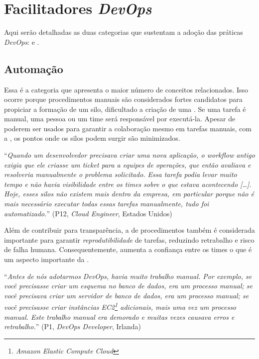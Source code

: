 \section{Facilitadores \emph{DevOps}}\label{secao_facilitadores}

Aqui serão detalhadas as duas categorias que sustentam a adoção das práticas
{\it DevOps}:  e .

\subsection{Automação} \label{ssec:automation}

Essa é a categoria que apresenta o maior número de conceitos relacionados. Isso
ocorre porque procedimentos manuais são considerados fortes candidatos para
propiciar a formação de um silo, dificultado a criação de uma \cc. Se uma tarefa
é manual, uma pessoa ou um time será responsável por executá-la. Apesar de
 poderem ser usados para garantir a
colaboração mesmo em tarefas manuais, com a , os pontos onde os
silos podem surgir são minimizados.

\begin{mq}
``\emph{Quando um desenvolvedor precisava criar uma nova aplicação, o workflow
antigo exigia que ele criasse um ticket para a equipes de operações, que então
avaliava e resolveria manualmente o problema solicitado. Essa tarefa podia levar
muito tempo e não havia visibilidade entre os times sobre o que estava
acontecendo [\ldots]. Hoje, esses silos não existem mais dentro da empresa,
em particular porque não é mais necessário executar todas essas tarefas
manualmente, tudo foi automatizado.}'' (P12, {\it Cloud Engineer}, Estados Unidos)
\end{mq}

Além de contribuir para transparência, a  de procedimentos
também é considerada importante para garantir \emph{reprodutibilidade} de
tarefas, reduzindo retrabalho e risco de falha humana. Consequentemente,
 aumenta a confiança entre os times o que é um aspecto importante
da \cc.

\begin{mq}
``\emph{Antes de nós adotarmos DevOps, havia muito trabalho manual. Por exemplo,
se você precisasse criar um esquema no banco de dados, era um processo manual;
se você precisava criar um servidor de banco de dados, era um processo manual;
se você precisasse criar instâncias EC2\footnote{{\it Amazon Elastic Compute Cloud}}
adicionais, mais uma vez um processo manual. Este trabalho manual era demorado
e muitas vezes causava erros e retrabalho.}'' (P1, {\it DevOps Developer}, Irlanda)
\end{mq}

